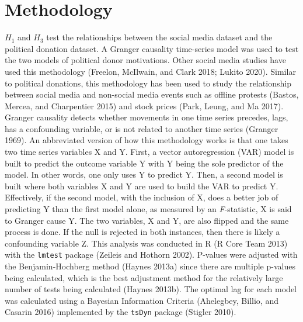 \documentclass[12pt,]{article}
\begin{document}
\hypertarget{methodology}{%
\section{Methodology}\label{methodology}}

\(H_{1}\) and \(H_{3}\) test the relationships between the social media
dataset and the political donation dataset. A Granger causality
time-series model was used to test the two models of political donor
motivations. Other social media studies have used this methodology
(Freelon, McIlwain, and Clark 2018; Lukito 2020). Similar to political
donations, this methodology has been used to study the relationship
between social media and non-social media events such as offline
protests (Bastos, Mercea, and Charpentier 2015) and stock prices (Park,
Leung, and Ma 2017). Granger causality detects whether movements in one
time series precedes, lags, has a confounding variable, or is not
related to another time series (Granger 1969). An abbreviated version of
how this methodology works is that one takes two time series variables X
and Y. First, a vector autoregression (VAR) model is built to predict
the outcome variable Y with Y being the sole predictor of the model. In
other words, one only uses Y to predict Y. Then, a second model is built
where both variables X and Y are used to build the VAR to predict Y.
Effectively, if the second model, with the inclusion of X, does a better
job of predicting Y than the first model alone, as measured by an
\emph{F}-statistic, X is said to Granger cause Y. The two variables, X
and Y, are also flipped and the same process is done. If the null is
rejected in both instances, then there is likely a confounding variable
Z. This analysis was conducted in R (R Core Team 2013) with the
\texttt{lmtest} package (Zeileis and Hothorn 2002). P-values were
adjusted with the Benjamin-Hochberg method (Haynes 2013a) since there
are multiple p-values being calculated, which is the best adjustment
method for the relatively large number of tests being calculated (Haynes
2013b). The optimal lag for each model was calculated using a Bayesian
Information Criteria (Ahelegbey, Billio, and Casarin 2016) implemented
by the \texttt{tsDyn} package (Stigler 2010).
\end{document}
